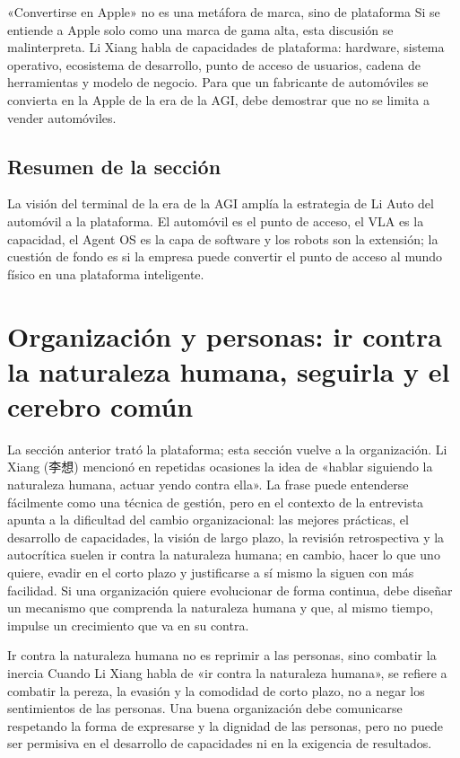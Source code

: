 \documentclass[a4paper]{article}
\begin{document}
\begin{warningbox}{«Convertirse en Apple» no es una metáfora de marca, sino de plataforma}
Si se entiende a Apple solo como una marca de gama alta, esta discusión se malinterpreta. Li Xiang habla de capacidades de plataforma: hardware, sistema operativo, ecosistema de desarrollo, punto de acceso de usuarios, cadena de herramientas y modelo de negocio. Para que un fabricante de automóviles se convierta en la Apple de la era de la AGI, debe demostrar que no se limita a vender automóviles.
\end{warningbox}

\subsection{Resumen de la sección}

La visión del terminal de la era de la AGI amplía la estrategia de Li Auto del automóvil a la plataforma. El automóvil es el punto de acceso, el VLA es la capacidad, el Agent OS es la capa de software y los robots son la extensión; la cuestión de fondo es si la empresa puede convertir el punto de acceso al mundo físico en una plataforma inteligente.
\section{Organización y personas: ir contra la naturaleza humana, seguirla y el cerebro común}

La sección anterior trató la plataforma; esta sección vuelve a la organización. Li Xiang (李想) mencionó en repetidas ocasiones la idea de «hablar siguiendo la naturaleza humana, actuar yendo contra ella». La frase puede entenderse fácilmente como una técnica de gestión, pero en el contexto de la entrevista apunta a la dificultad del cambio organizacional: las mejores prácticas, el desarrollo de capacidades, la visión de largo plazo, la revisión retrospectiva y la autocrítica suelen ir contra la naturaleza humana; en cambio, hacer lo que uno quiere, evadir en el corto plazo y justificarse a sí mismo la siguen con más facilidad. Si una organización quiere evolucionar de forma continua, debe diseñar un mecanismo que comprenda la naturaleza humana y que, al mismo tiempo, impulse un crecimiento que va en su contra.

\begin{knowledgebox}{Ir contra la naturaleza humana no es reprimir a las personas, sino combatir la inercia}
Cuando Li Xiang habla de «ir contra la naturaleza humana», se refiere a combatir la pereza, la evasión y la comodidad de corto plazo, no a negar los sentimientos de las personas. Una buena organización debe comunicarse respetando la forma de expresarse y la dignidad de las personas, pero no puede ser permisiva en el desarrollo de capacidades ni en la exigencia de resultados.
\end{knowledgebox}
\end{document}
